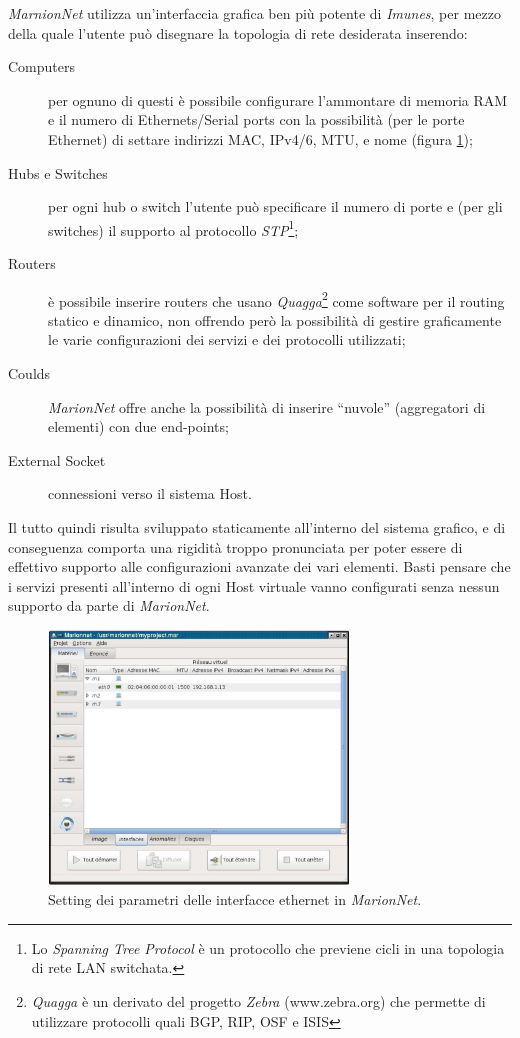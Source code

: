 \emph{MarnionNet} utilizza un'interfaccia grafica ben più potente di \emph{Imunes}, per mezzo della quale l'utente può disegnare\cite{MVNL08} la topologia di rete desiderata inserendo:
\begin{description}
\item[Computers] per ognuno di questi è possibile configurare l'ammontare di memoria RAM e il numero di Ethernets/Serial ports con la possibilità (per le porte Ethernet) di settare indirizzi MAC, IPv4/6, MTU, e nome (figura \ref{figura:marionnet_interfaces});

\item[Hubs e Switches] per ogni hub o switch l'utente può specificare il numero di porte e (per gli switches) il supporto al protocollo \emph{STP}\footnote{Lo \emph{Spanning Tree Protocol} è un protocollo che previene cicli in una topologia di rete LAN switchata.};

\item[Routers] è possibile inserire routers che usano \emph{Quagga}\footnote{\emph{Quagga} è un derivato del progetto \emph{Zebra} (www.zebra.org) che permette di utilizzare protocolli quali BGP, RIP, OSF e ISIS} come software per il routing statico e dinamico, non offrendo però la possibilità di gestire graficamente le varie configurazioni dei servizi e dei protocolli utilizzati;

\item[Coulds] \emph{MarionNet} offre anche la possibilità di inserire ``nuvole'' (aggregatori di elementi) con due end-points;
\item[External Socket] connessioni verso il sistema Host.
\end{description}

Il tutto quindi risulta sviluppato staticamente all'interno del sistema grafico, e di conseguenza comporta una rigidità troppo pronunciata per poter essere di effettivo supporto alle configurazioni avanzate dei vari elementi. Basti pensare che i servizi presenti all'interno di ogni Host virtuale vanno configurati senza nessun supporto da parte di \emph{MarionNet}.

\begin{figure}[!ht]
	\centering
	\includegraphics[width=8cm]{images/marionnet_interfaces.png}
	\caption{Setting dei parametri delle interfacce ethernet in \emph{MarionNet}.}
	\label{figura:marionnet_interfaces}
\end{figure}

